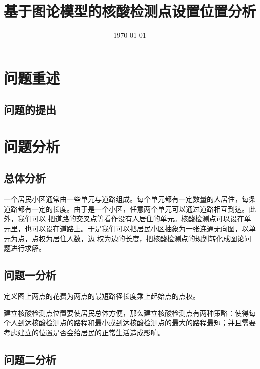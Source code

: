 \documentclass{cumcmthesis}
\title{基于图论模型的核酸检测点设置位置分析}
\date{\today}
\begin{document}
\maketitle

\begin{abstract}

\end{abstract}

\tableofcontents

\newpage
\section{问题重述}

\subsection{问题的提出}

\section{问题分析}

\subsection{总体分析}

一个居民小区通常由一些单元与道路组成。每个单元都有一定数量的人居住，每条道路都有一定的长度。由于是一个小区，任意两个单元可以通过道路相互到达。此外，我们可以
把道路的交叉点等看作没有人居住的单元。核酸检测点可以设在单元里，也可以设在道路上。于是我们可以把居民小区抽象为一张连通无向图，以单元为点，点权为居住人数，边
权为边的长度，把核酸检测点的规划转化成图论问题进行求解。

\subsection{问题一分析}

定义图上两点的花费为两点的最短路径长度乘上起始点的点权。

建立核酸检测点位置要使居民总体方便，那么建立核酸检测点有两种策略：使得每个人到达核酸检测点的路程和最小或到达核酸检测点的最大的路程最短；并且需要考虑建立的位置是否会给居民的正常生活造成影响。

\subsection{问题二分析}
\end{document}
